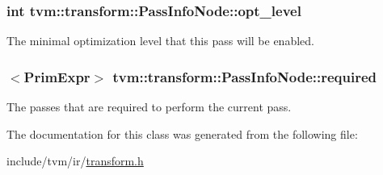 \subsubsection[{\texorpdfstring{opt\+\_\+level}{opt_level}}]{\setlength{\rightskip}{0pt plus 5cm}int tvm\+::transform\+::\+Pass\+Info\+Node\+::opt\+\_\+level}\hypertarget{classtvm_1_1transform_1_1PassInfoNode_a8e22e5767cd899bb9aef1ee1c529a2a7}{}\label{classtvm_1_1transform_1_1PassInfoNode_a8e22e5767cd899bb9aef1ee1c529a2a7}


The minimal optimization level that this pass will be enabled. 

\subsubsection[{\texorpdfstring{required}{required}}]{$<${\bf Prim\+Expr}$>$ tvm\+::transform\+::\+Pass\+Info\+Node\+::required}\hypertarget{classtvm_1_1transform_1_1PassInfoNode_a9af9278b785b3c11b90b00640f68dc87}{}\label{classtvm_1_1transform_1_1PassInfoNode_a9af9278b785b3c11b90b00640f68dc87}


The passes that are required to perform the current pass. 



The documentation for this class was generated from the following file\+:\begin{DoxyCompactItemize}
\item 
include/tvm/ir/\hyperlink{include_2tvm_2ir_2transform_8h}{transform.\+h}\end{DoxyCompactItemize}
